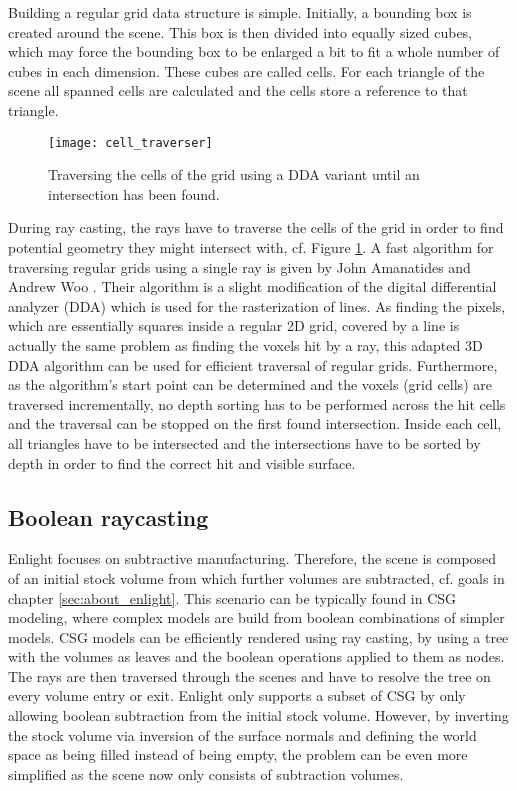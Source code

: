 Building a regular grid data structure is simple. Initially, a bounding box is created around the scene. This box is then divided into equally sized cubes, which may force the bounding box to be enlarged a bit to fit a whole number of cubes in each dimension. These cubes are called cells. For each triangle of the scene all spanned cells are calculated and the cells store a reference to that triangle.

\begin{figure}
\centering
\texttt{[image: cell\_traverser]}
\caption{Traversing the cells of the grid using a DDA variant until an intersection has been found.}
\label{fig:cell_traverser}
\end{figure}

During ray casting, the rays have to traverse the cells of the grid in order to find potential geometry they might intersect with, cf. Figure \ref{fig:cell_traverser}. A fast algorithm for traversing regular grids using a single ray is given by John Amanatides and Andrew Woo \cite{3DDDA}. Their algorithm is a slight modification of the digital differential analyzer (DDA) which is used for the rasterization of lines. As finding the pixels, which are essentially squares inside a regular 2D grid, covered by a line is actually the same problem as finding the voxels hit by a ray, this adapted 3D DDA algorithm can be used for efficient traversal of regular grids. Furthermore, as the algorithm's start point can be determined and the voxels (grid cells) are traversed incrementally, no depth sorting has to be performed across the hit cells and the traversal can be stopped on the first found intersection. Inside each cell, all triangles have to be intersected and the intersections have to be sorted by depth in order to find the correct hit and visible surface.


\subsection{Boolean raycasting}
\label{sec:boolean_raycasting}

Enlight focuses on subtractive manufacturing. Therefore, the scene is composed of an initial stock volume from which further volumes are subtracted, cf. goals in chapter \ref{sec:about_enlight}. This scenario can be typically found in CSG modeling, where complex models are build from boolean combinations of simpler models. CSG models can be efficiently rendered using ray casting, by using a tree with the volumes as leaves and the boolean operations applied to them as nodes. The rays are then traversed through the scenes and have to resolve the tree on every volume entry or exit. Enlight only supports a subset of CSG by only allowing boolean subtraction from the initial stock volume. However, by inverting the stock volume via inversion of the surface normals and defining the world space as being filled instead of being empty, the problem can be even more simplified as the scene now only consists of subtraction volumes.

